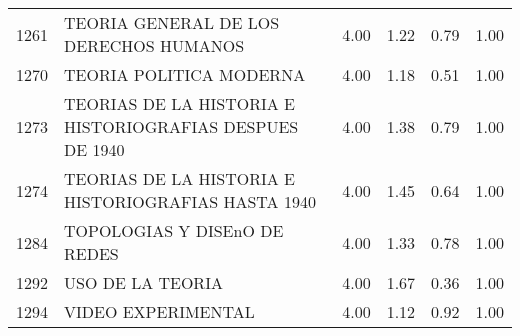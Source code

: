 \begin{table}[ht]
\begin{tabular}{rlrrrr}
  1261 & TEORIA GENERAL DE LOS DERECHOS HUMANOS & 4.00 & 1.22 & 0.79 & 1.00 \\ 
  1270 & TEORIA POLITICA MODERNA & 4.00 & 1.18 & 0.51 & 1.00 \\ 
  1273 & TEORIAS DE LA HISTORIA E HISTORIOGRAFIAS DESPUES DE 1940 & 4.00 & 1.38 & 0.79 & 1.00 \\ 
  1274 & TEORIAS DE LA HISTORIA E HISTORIOGRAFIAS HASTA 1940 & 4.00 & 1.45 & 0.64 & 1.00 \\ 
  1284 & TOPOLOGIAS Y DISEnO DE REDES & 4.00 & 1.33 & 0.78 & 1.00 \\ 
  1292 & USO DE LA TEORIA & 4.00 & 1.67 & 0.36 & 1.00 \\ 
  1294 & VIDEO EXPERIMENTAL & 4.00 & 1.12 & 0.92 & 1.00 \\ 
   \hline
\end{tabular}
\end{table}
